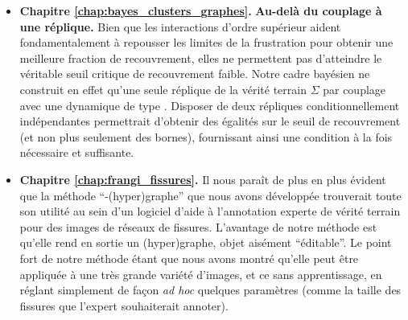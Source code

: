 \begin{itemize}
    \item \textbf{Chapitre \ref{chap:bayes_clusters_graphes}.} \textbf{Au-delà du couplage à une réplique.} Bien que les interactions d'ordre supérieur aident fondamentalement à repousser les limites de la frustration pour obtenir une meilleure fraction de recouvrement, elles ne permettent pas d'atteindre le véritable seuil critique de recouvrement faible. Notre cadre bayésien ne construit en effet qu'une seule réplique de la vérité terrain $\Sigma$ par couplage avec une dynamique de type \SW. Disposer de deux répliques conditionnellement indépendantes permettrait d'obtenir des égalités sur le seuil de recouvrement (et non plus seulement des bornes), fournissant ainsi une condition à la fois nécessaire et suffisante.
    \item \textbf{Chapitre \ref{chap:frangi_fissures}.} Il nous paraît de plus en plus évident que la méthode ``-(hyper)graphe'' que nous avons développée trouverait toute son utilité au sein d'un logiciel d'aide à l'annotation experte de vérité terrain pour des images de réseaux de fissures. L'avantage de notre méthode est qu'elle rend en sortie un (hyper)graphe,  objet aisément ``éditable''. Le point fort de notre méthode étant que nous avons montré qu'elle peut être appliquée à une très grande variété d'images, et ce sans apprentissage, en réglant simplement de façon \emph{ad hoc} quelques paramètres (comme la taille des fissures que l'expert souhaiterait annoter).
\end{itemize}
